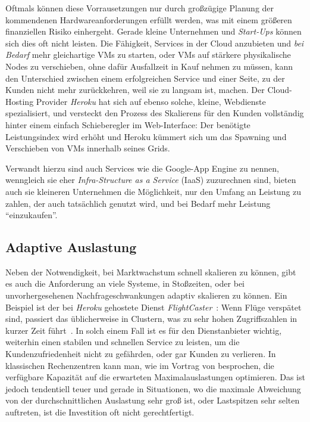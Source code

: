 Oftmals können diese Vorrausetzungen nur durch großzügige Planung der
kommendenen Hardwareanforderungen erfüllt werden, was mit einem
größeren finanziellen Risiko einhergeht. Gerade kleine Unternehmen und
\emph{Start-Ups} können sich dies oft nicht leisten. Die Fähigkeit,
Services in der Cloud anzubieten und \emph{bei Bedarf} mehr
gleichartige VMs zu starten, oder VMs auf stärkere physikalische Nodes
zu verschieben, ohne dafür Ausfallzeit in Kauf nehmen zu müssen, kann
den Unterschied zwischen einem erfolgreichen Service und einer Seite,
zu der Kunden nicht mehr zurückkehren, weil sie zu langsam ist,
machen. Der Cloud-Hosting Provider \emph{Heroku} hat sich auf ebenso
solche, kleine, Webdienste spezialisiert, und versteckt den Prozess
des Skalierens für den Kunden vollständig hinter einem einfach
Schieberegler im Web-Interface: Der benötigte Leistungsindex wird
erhöht und Heroku kümmert sich um das Spawning und Verschieben von
VMs innerhalb seines Grids.

Verwandt hierzu sind auch Services wie die Google-App Engine zu
nennen, wenngleich sie eher \emph{Infra-Structure as a Service} (IaaS)
zuzurechnen sind, bieten auch sie kleineren Unternehmen die
Möglichkeit, nur den Umfang an Leistung zu zahlen, der auch
tatsächlich genutzt wird, und bei Bedarf mehr Leistung
"`einzukaufen"'.

\subsection{Adaptive Auslastung}
\label{sec:adaptive-auslastung}
Neben der Notwendigkeit, bei Marktwachstum schnell skalieren zu
können, gibt es auch die Anforderung an viele Systeme, in Stoßzeiten,
oder bei unvorhergesehenen Nachfrageschwankungen adaptiv skalieren zu
können. Ein Beispiel ist der bei \emph{Heroku} gehostete Dienst
\emph{FlightCaster}~\cite{flightcaster}: Wenn Flüge verspätet sind,
passiert das üblicherweise in Clustern, was zu sehr hohen
Zugriffszahlen in kurzer Zeit führt~\cite{flightcaster_success}. In
solch einem Fall ist es für den Dienstanbieter wichtig, weiterhin
einen stabilen und schnellen Service zu leisten, um die
Kundenzufriedenheit nicht zu gefährden, oder gar Kunden zu
verlieren. In klassischen Rechenzentren kann man, wie im Vortrag von
\cite{benchmarkingthecloud} besprochen, die verfügbare Kapazität auf
die erwarteten Maximalauslastungen optimieren. Das ist jedoch
tendentiell teuer und gerade in Situationen, wo die maximale
Abweichung von der durchschnittlichen Auslastung sehr groß ist, oder
Lastspitzen sehr selten auftreten, ist die Investition oft nicht
gerechtfertigt.

